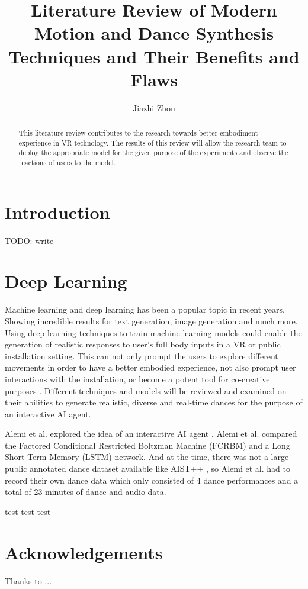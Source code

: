 \documentclass[final,5p,times,twocolumn,authoryear]{article}
\begin{document}
\title{Literature Review of Modern Motion and Dance Synthesis Techniques and Their Benefits and Flaws}
\author{Jiazhi Zhou}
\maketitle

\begin{abstract}

This literature review contributes to the research towards better embodiment experience in VR technology. The results of this review will allow the research team to deploy the appropriate model for the given purpose of the experiments and observe the reactions of users to the model.

\end{abstract}

\section{Introduction}

TODO: write

\section{Deep Learning}

Machine learning and deep learning has been a popular topic in recent years. Showing incredible results for text generation, image generation and much more.
Using deep learning techniques to train machine learning models could enable the generation of realistic responses to user's full body inputs in a VR or public installation setting.
This can not only prompt the users to explore different movements in order to have a better embodied experience, not also prompt user interactions with the installation, or become a potent tool for co-creative purposes \cite{Wallace2023}.
Different techniques and models will be reviewed and examined on their abilities to generate realistic, diverse and real-time dances for the purpose of an interactive AI agent.

Alemi et al. explored the idea of an interactive AI agent \cite{Alemi2017}. Alemi et al. compared the Factored Conditional Restricted Boltzman Machine (FCRBM) and a Long Short Term Memory (LSTM) network. And at the time, there was not a large public annotated dance dataset available like AIST++ \cite{Li2021}, so Alemi et al. had to record their own dance data which only consisted of 4 dance performances and a total of 23 minutes of dance and audio data.

test test  test

\section*{Acknowledgements}
Thanks to ...

 

\end{document}
